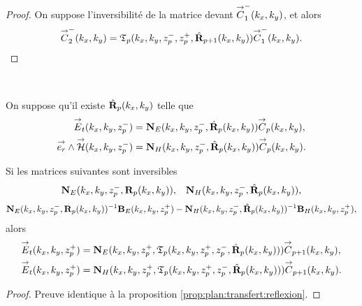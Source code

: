 \begin{proof}
      On suppose l'inversibilité de la matrice devant \({\overset{\rightarrow}{C}}_{1}^-(k_x,k_y)\), et alors
      \begin{equation*}
        {\overset{\rightarrow}{C}}_{2}^-(k_x,k_y) = \mathfrak{T}_p(k_x,k_y,z_p^-,z_p^+,\hat{\mathbf{R}}_{p+1}(k_x,k_y)) {\overset{\rightarrow}{C}}_{1}^-(k_x,k_y).
      \end{equation*}
    \end{proof}

    \begin{prop}%
      \label{prop:plan:relevement:reflexion}{}~

      On suppose qu'il existe \(\hat{\mathbf{R}}_{p}(k_x,k_y)\) telle que 
      \begin{align*}
        {\overset{\rightarrow}{E}}_t(k_x,k_y,z_p^-) &= \mathbf{N}_{E}(k_x,k_y,z_p^-,\hat{\mathbf{R}}_{p}(k_x,k_y)){\overset{\rightarrow}{C}}_{p}(k_x,k_y),
        \\
        {\overset{\rightarrow}{e_r}}\wedge{\overset{\rightarrow}{\mathcal{H}}}(k_x,k_y,z_p^-) &= \mathbf{N}_{H}(k_x,k_y,z_p^-,\hat{\mathbf{R}}_{p}(k_x,k_y)){\overset{\rightarrow}{C}}_{p}(k_x,k_y).
      \end{align*}

      Si les matrices suivantes sont inversibles
      \begin{align*}
        \mathbf{N}_{E}(k_x,k_y,z_p^-,\mathbf{R}_{p}(k_x,k_y)), && \mathbf{N}_{H}(k_x,k_y,z_p^-,\hat{\mathbf{R}}_{p}(k_x,k_y)),
      \end{align*}
      \begin{align*}
        \mathbf{N}_{E}(k_x,k_y,z_p^-,\mathbf{R}_{p}(k_x,k_y))^{-1}\mathbf{B}_{E}(k_x,k_y,z_p^+) - \mathbf{N}_{H}(k_x,k_y,z_p^-,\hat{\mathbf{R}}_{p}(k_x,k_y))^{-1}\mathbf{B}_{H}(k_x,k_y,z_p^+),
      \end{align*}
      alors
      \begin{align*}
        {\overset{\rightarrow}{E}}_t(k_x,k_y,z_p^+) &= \mathbf{N}_{E}(k_x,k_y,z_p^+,\mathfrak{T}_p(k_x,k_y,z_p^+,z_p^-,\hat{\mathbf{R}}_{p}(k_x,k_y))){\overset{\rightarrow}{C}}_{p+1}(k_x,k_y),
        \\
        {\overset{\rightarrow}{E}}_t(k_x,k_y,z_p^+) &= \mathbf{N}_{H}(k_x,k_y,z_p^+,\mathfrak{T}_p(k_x,k_y,z_p^+,z_p^-,\hat{\mathbf{R}}_{p}(k_x,k_y))){\overset{\rightarrow}{C}}_{p+1}(k_x,k_y).
      \end{align*}
    \end{prop}

    \begin{proof}
     Preuve identique à la proposition \ref{prop:plan:transfert:reflexion}.
    \end{proof}

